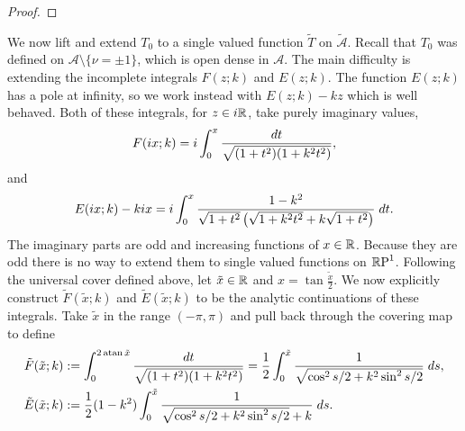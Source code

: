 \documentclass{article}
\begin{document}
\begin{lem}
\begin{proof}


\end{proof}
\end{lem}

We now lift and extend $T_0$ to a single valued function $\tilde{T}$ on $\mathcal{\tilde{A}}$. Recall that $T_0$ was defined on $\mathcal{A}\setminus\{\nu = \pm 1\}$, which is open dense in $\mathcal{A}$. The main difficulty is extending the incomplete integrals $F(z;k)$ and $E(z;k)$. The function $E(z;k)$ has a pole at infinity, so we work instead with $E(z;k) - kz$ which is well behaved. Both of these integrals, for $z\in i\mathbb{R}$, take purely imaginary values,
\[
F(i x; k)
= i \int_0^x \frac{dt}{\sqrt{(1+t^2)(1+k^2 t^2)}},
\]
and
\[
E(i x; k) - ki x
= i \int_0^x \frac{1-k^2}{\sqrt{1+t^2}\left( \sqrt{1+k^2t^2} + k\sqrt{1+t^2} \right)} \;dt.
\]
The imaginary parts are odd and increasing functions of $x\in\mathbb{R}$. Because they are odd there is no way to extend them to single valued functions on $\mathbb{R}\text{P}^1$. Following the universal cover defined above, let $\tilde{x}\in\mathbb{R}$ and $x = \tan\frac{\tilde{x}}{2}$. We now explicitly construct $\tilde{F}(\tilde{x};k)$ and $\tilde{E}(\tilde{x};k)$ to be the analytic continuations of these integrals. Take $\tilde{x}$ in the range $(-\pi,\pi)$ and pull back through the covering map to define
\begin{align*}
\tilde{F}(\tilde{x};k)
&:= \int_0^{2 \operatorname{atan} \tilde{x}} \frac{dt}{\sqrt{(1+t^2)(1+k^2t^2)}}
= \frac{1}{2} \int_0^{\tilde{x}} \frac{1}{\sqrt{\cos^2 s/2 + k^2 \sin^2 s/2}} \;ds, \\
\tilde{E}(\tilde{x}; k)
&:= \frac{1}{2} (1-k^2) \int_0^{\tilde{x}} \frac{1}{\sqrt{\cos^2 s/2 + k^2\sin^2 s/2} + k}\;ds.
\end{align*}
\end{document}
